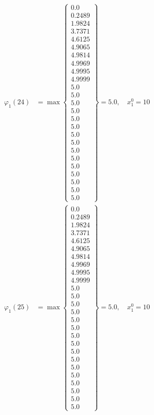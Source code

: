 \documentclass{article}
\begin{document}
\begin{align*}
  
  
  
\varphi_{1}(24) &= \max \left\{ \begin{array}{c}
0.0 \\
 0.2489 \\
 1.9824 \\
 3.7371 \\
 4.6125 \\
 4.9065 \\
 4.9814 \\
 4.9969 \\
 4.9995 \\
 4.9999 \\
 5.0 \\
 5.0 \\
 5.0 \\
 5.0 \\
 5.0 \\
 5.0 \\
 5.0 \\
 5.0 \\
 5.0 \\
 5.0 \\
 5.0 \\
 5.0 \\
 5.0 \\
 5.0 \\
 5.0
\end{array} \right\}=5.0,\quad x_{1}^0=10\\
  
  
  
  
\varphi_{1}(25) &= \max \left\{ \begin{array}{c}
0.0 \\
 0.2489 \\
 1.9824 \\
 3.7371 \\
 4.6125 \\
 4.9065 \\
 4.9814 \\
 4.9969 \\
 4.9995 \\
 4.9999 \\
 5.0 \\
 5.0 \\
 5.0 \\
 5.0 \\
 5.0 \\
 5.0 \\
 5.0 \\
 5.0 \\
 5.0 \\
 5.0 \\
 5.0 \\
 5.0 \\
 5.0 \\
 5.0 \\
 5.0 \\
 5.0
\end{array} \right\}=5.0,\quad x_{1}^0=10\\
  

\end{align*}
\end{document}
